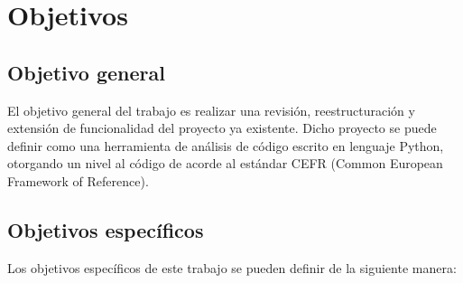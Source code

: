 \documentclass[a4paper, 12pt]{book}
\begin{document}

\cleardoublepage %
\chapter{Objetivos} %
\label{chap:objetivos} %

\section{Objetivo general} %
\label{sec:objetivo-general} %



El objetivo general del trabajo es realizar una revisión, reestructuración y extensión de funcionalidad del proyecto ya existente. Dicho proyecto se puede definir como una herramienta de análisis de código escrito en lenguaje Python, otorgando un nivel al código de acorde al estándar CEFR (Common European Framework of Reference).

\section{Objetivos específicos}
\label{sec:objetivos-especificos}


Los objetivos específicos de este trabajo se pueden definir de la siguiente manera:
\end{document}
